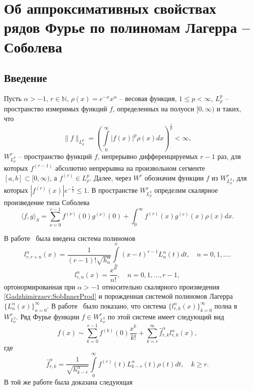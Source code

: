 
\chapter{Об аппроксимативных свойствах рядов Фурье по полиномам Лагерра -- Соболева}

\section*{Введение}

Пусть $\alpha>-1$, $r\in \mathbb{N}$, $\rho(x)=e^{-x}x^\alpha$ -- весовая функция, $1\le p<\infty$, $L^p_\rho$ -- пространство измеримых функций $f$, определенных на полуоси $[0, \infty)$ и таких, что
$$
\|f\|_{L^p_\rho}=\left(\int\limits_0^{\infty}|f(x)|^p\rho(x) dx\right)^\frac{1}{p}<\infty,
$$
$W^r_{L^p_\rho}$ -- пространство функций $f$, непрерывно дифференцируемых $r-1$ раз, для которых $f^{(r-1)}$ абсолютно непрерывна на произвольном сегменте $[a, b]\subset[0, \infty)$, а $f^{(r)}\in L^p_\rho$.
Далее, через $W^r$ обозначим функции $f$ из $W^r_{L^2_\rho}$, для которых $|f^{(r)}(x)|e^{-\frac x2}\le 1$. В пространстве $W^r_{L^2_\rho}$ определим скалярное произведение типа Соболева
\begin{equation}\label{Gadzhimirzaev:SobInnerProd}
\langle f,g \rangle _S =\sum_{\nu=0}^{r-1}f^{(\nu)}(0)g^{(\nu)}(0)+\int_{0}^{\infty} f^{(r)}(x)g^{(r)}(x)\rho(x)dx.
\end{equation}

В работе~\cite{Gadzhimirzaev:DEMR2016} была введена система полиномов
\begin{equation*}
l_{r,r+n}^{\alpha}(x) =\frac{1}{(r-1)!\sqrt{h_n^\alpha}}\int\limits_{0}^x(x-t)^{r-1}L_{n}^{\alpha}(t)dt, \quad n=0,1,\ldots.
\end{equation*}
\begin{equation*}
l_{r,n}^{\alpha}(x) =\frac{x^n}{n!}, \quad n=0,1,\ldots, r-1,
\end{equation*}
ортонормированная при $\alpha>-1$ относительно скалярного произведения \eqref{Gadzhimirzaev:SobInnerProd} и порожденная системой полиномов Лагерра $\{L_{n}^{\alpha}(x)\}_{n=0}^\infty$.
В работе~\cite{Gadzhimirzaev:ShII-MMG} было показано, что система $\{l^\alpha_{r,k}(x)\}_{k=0}^\infty$ полна в $W^r_{L^2_\rho}$. Ряд Фурье функции $f\in W^r_{L^2_\rho}$ по этой системе имеет следующий вид
\begin{equation}\label{Gadzhimirzaev:Fourier_Series}
f(x)\sim \sum_{k=0}^{r-1}f^{(k)}(0)\frac{x^k}{k!}+\sum_{k=r}^{\infty} \hat{f}_{r,k}^\alpha l_{r,k}^\alpha(x),
\end{equation}
где
\begin{equation*}
\hat{f}_{r,k}^\alpha=\frac{1}{\sqrt{h_{k-r}^\alpha}}\int\limits_0^\infty f^{(r)}(t)L_{k-r}^\alpha(t)\rho(t)dt, \quad k\ge r.
\end{equation*}
В той же работе была доказана следующая

